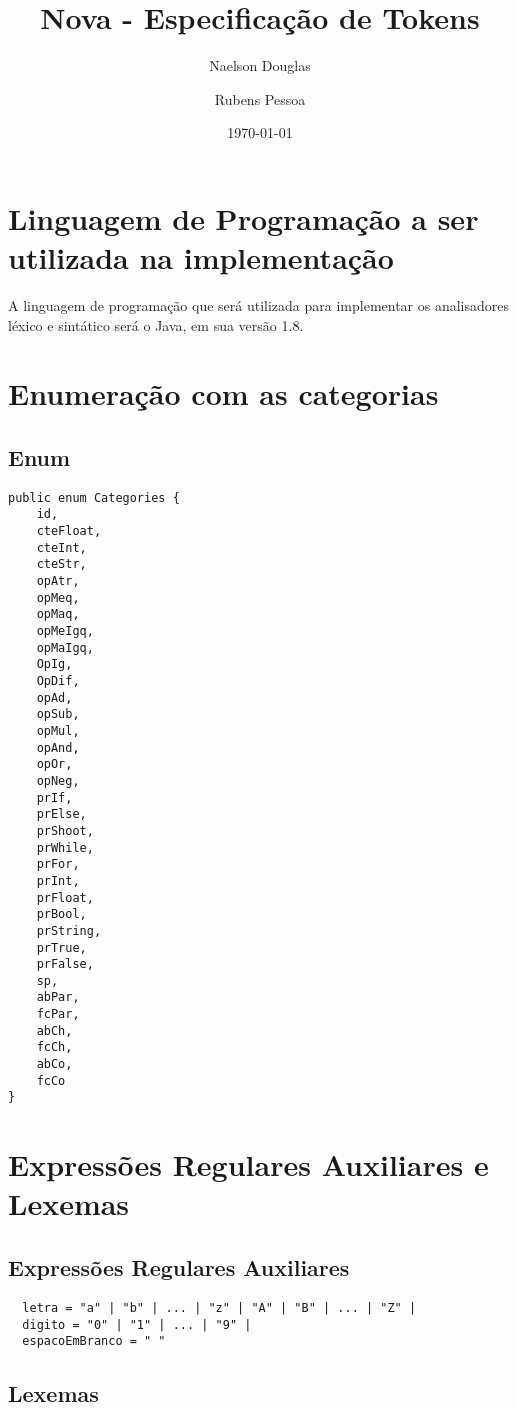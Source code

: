 \documentclass[a4paper, 12pt, article]{memoir}
\title{Nova - Especificação de Tokens}
\author{Naelson Douglas \and Rubens Pessoa}
\date{\today}
\begin{document}
\frontmatter
\begin{titlingpage}
  \maketitle
\end{titlingpage}

\tableofcontents

\mainmatter

\section{Linguagem de Programação a ser utilizada na implementação}
\label{sec:intro}
A linguagem de programação que será utilizada para implementar os analisadores léxico e sintático será o Java, em sua versão 1.8.

\section{Enumeração com as categorias}
\label{sec:conjunto}

\subsection{Enum}
\begin{lstlisting}
public enum Categories {
	id,
	cteFloat,
	cteInt,
	cteStr,
	opAtr,
	opMeq,
	opMaq,
	opMeIgq,
	opMaIgq,
	OpIg,
	OpDif,
	opAd,
	opSub,
	opMul,
	opAnd,
	opOr,
	opNeg,
	prIf,
	prElse,
	prShoot,
	prWhile,
	prFor,
	prInt,
	prFloat,
	prBool,
	prString,
	prTrue,
	prFalse,
	sp,
	abPar,
	fcPar,
	abCh,
	fcCh,
	abCo,
	fcCo
}
\end{lstlisting}

\section{Expressões Regulares Auxiliares e Lexemas}
\label{sec:era e lex}

\subsection{Expressões Regulares Auxiliares}
\label{subsec:era}

\begin{lstlisting}
  letra = "a" | "b" | ... | "z" | "A" | "B" | ... | "Z" |
  digito = "0" | "1" | ... | "9" |
  espacoEmBranco = " "
\end{lstlisting}

\subsection{Lexemas}
\label{subsec:lexemas}
\end{document}
